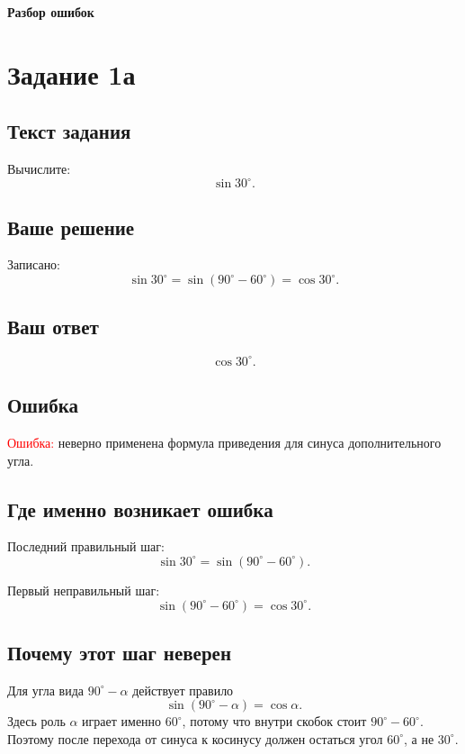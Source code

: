 \documentclass[12pt,a4paper]{article}
\begin{document}
\newpage
\vspace*{\fill}
\begin{center}
{\LARGE\bfseries Разбор ошибок}
\end{center}
\vspace*{\fill}

\newpage
{}\label{task:1a}
\section*{Задание 1а}

\subsection*{Текст задания}
Вычислите:
\[
\sin 30^\circ.
\]

\subsection*{Ваше решение}
Записано:
\[
\sin 30^\circ=\sin(90^\circ-60^\circ)=\cos 30^\circ.
\]

\subsection*{Ваш ответ}
\[
\cos 30^\circ.
\]

\subsection*{Ошибка}
\textcolor{red}{Ошибка:} неверно применена формула приведения для синуса дополнительного угла.

\subsection*{Где именно возникает ошибка}
Последний правильный шаг:
\[
\sin 30^\circ=\sin(90^\circ-60^\circ).
\]

Первый неправильный шаг:
\[
\sin(90^\circ-60^\circ)=\cos 30^\circ.
\]

\subsection*{Почему этот шаг неверен}
Для угла вида $90^\circ-\alpha$ действует правило
\[
\sin(90^\circ-\alpha)=\cos\alpha.
\]
Здесь роль $\alpha$ играет именно $60^\circ$, потому что внутри скобок стоит $90^\circ-60^\circ$.
Поэтому после перехода от синуса к косинусу должен остаться угол $60^\circ$, а не $30^\circ$.
\end{document}
